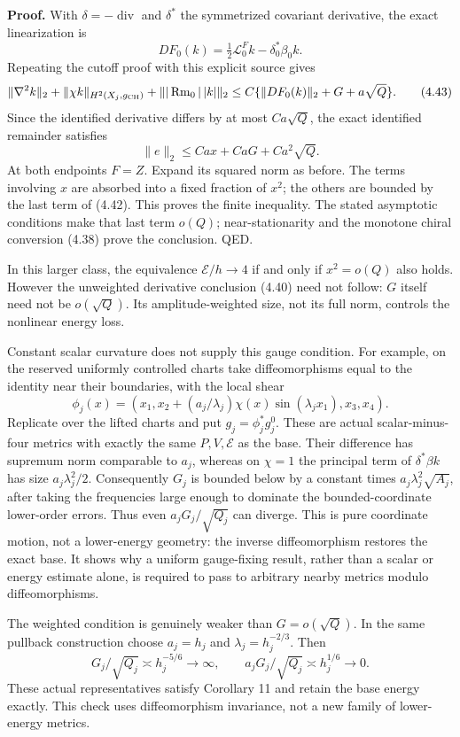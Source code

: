 \documentclass[
  10pt,
]{article}
\begin{document}
\textbf{Proof.} With \(\delta=-\operatorname{div}\) and \(\delta^*\) the
symmetrized covariant derivative, the exact linearization is \[
 DF_0(k)=\tfrac12\mathcal L_0^Fk-\delta_0^*\beta_0k.
\] Repeating the cutoff proof with this explicit source gives \[
 \|\nabla^2k\|_2+\|\chi k\|_{H^2(X_j,g_{\rm CH})}
          +\||\operatorname{Rm}_0|\,|k|\|_2
 \le C\{\|DF_0(k)\|_2+G+a\sqrt Q\}. \tag{4.43}
\] Since the identified derivative differs by at most \(Ca\sqrt Q\), the
exact identified remainder satisfies \[
 \|e\|_2\le Ca x+CaG+Ca^2\sqrt Q.
\] At both endpoints \(F=Z\). Expand its squared norm as before. The
terms involving \(x\) are absorbed into a fixed fraction of \(x^2\); the
others are bounded by the last term of (4.42). This proves the finite
inequality. The stated asymptotic conditions make that last term
\(o(Q)\); near-stationarity and the monotone chiral conversion (4.38)
prove the conclusion. QED.

In this larger class, the equivalence \(\mathcal E/h\to4\) if and only
if \(x^2=o(Q)\) also holds. However the unweighted derivative conclusion
(4.40) need not follow: \(G\) itself need not be \(o(\sqrt Q)\). Its
amplitude-weighted size, not its full norm, controls the nonlinear
energy loss.

Constant scalar curvature does not supply this gauge condition. For
example, on the reserved uniformly controlled charts take
diffeomorphisms equal to the identity near their boundaries, with the
local shear \[
 \phi_j(x)=
 (x_1,x_2+(a_j/\lambda_j)\chi(x)\sin(\lambda_jx_1),x_3,x_4).
\] Replicate over the lifted charts and put \(g_j=\phi_j^*g_j^0\). These
are actual scalar-minus-four metrics with exactly the same
\(P,V,\mathcal E\) as the base. Their difference has supremum norm
comparable to \(a_j\), whereas on \(\chi=1\) the principal term of
\(\delta^*\beta k\) has size \(a_j\lambda_j^2/2\). Consequently \(G_j\)
is bounded below by a constant times \(a_j\lambda_j^2\sqrt{A_j}\), after
taking the frequencies large enough to dominate the bounded-coordinate
lower-order errors. Thus even \(a_jG_j/\sqrt{Q_j}\) can diverge. This is
pure coordinate motion, not a lower-energy geometry: the inverse
diffeomorphism restores the exact base. It shows why a uniform
gauge-fixing result, rather than a scalar or energy estimate alone, is
required to pass to arbitrary nearby metrics modulo diffeomorphisms.

The weighted condition is genuinely weaker than \(G=o(\sqrt Q)\). In the
same pullback construction choose \(a_j=h_j\) and
\(\lambda_j=h_j^{-2/3}\). Then \[
 G_j/\sqrt{Q_j}\asymp h_j^{-5/6}\longrightarrow\infty,\qquad
 a_jG_j/\sqrt{Q_j}\asymp h_j^{1/6}\longrightarrow0.
\] These actual representatives satisfy Corollary 11 and retain the base
energy exactly. This check uses diffeomorphism invariance, not a new
family of lower-energy metrics.
\end{document}
